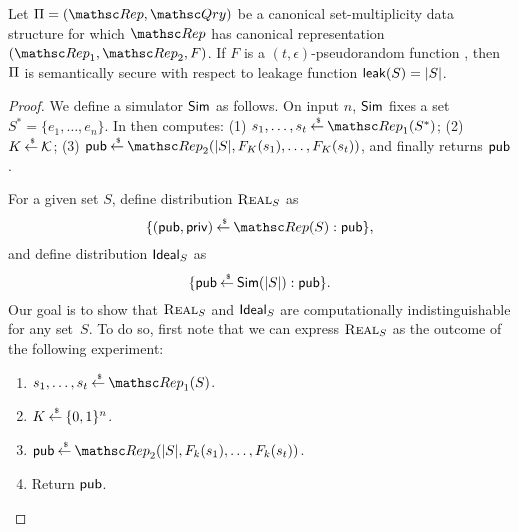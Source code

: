 \begin{theorem}
Let $\setprim=(\Rep, \Qry)$ be a canonical set-multiplicity data structure for which $\Rep$ has canonical representation
$(\Rep_1, \Rep_2, F)$. If $F$ is a $(t, \epsilon)$-pseudorandom
function , then $\Pi$ is semantically secure
with respect to leakage function ${\sf leak}(S) = |S|$.
\end{theorem}
\begin{proof}
We define a simulator ${\sf Sim}$ as follows. On input $n$, ${\sf Sim}$ fixes a
set $S^*=\{e_1, \ldots, e_n\}$. In then computes:
(1) $s_1, \ldots, s_t \getsr \Rep_1(S^*)$;
(2) $K {\:\stackrel{{\scriptscriptstyle \hspace{0.2em}\$}} {\leftarrow}\:} {\cal K}$;
(3) $\pubaux \getsr \Rep_2(|S|, F_K(s_1), \ldots, F_K(s_t))$, and
finally returns ${\sf pub}$.

\def\hyb{\mbox{{\sc Hyb}}}

For a given set $S$, define distribution $\mbox{{\sc Real}}_S$ as
\[ \{ (\pubaux, \privaux) \getsr \Rep(S) : \pubaux\},\]
and define distribution $\mbox{{\sf Ideal}}_S$ as
\[ \{ {\sf pub} {\:\stackrel{{\scriptscriptstyle \hspace{0.2em}\$}} {\leftarrow}\:} {\sf Sim}(|S|) : {\sf pub} \}.\]
Our goal is to show that $\mbox{{\sc Real}}_S$ and $\mbox{{\sf Ideal}}_S$ are computationally
indistinguishable for any set~$S$. 
To do so, first note that we can express $\mbox{{\sc Real}}_S$ as the outcome of
the following experiment: 
\begin{enumerate}
\item $s_1, \ldots, s_t \getsr \Rep_1(S)$.
\item $K {\:\stackrel{{\scriptscriptstyle \hspace{0.2em}\$}} {\leftarrow}\:} \{0,1\}^n$.
\item $\pubaux \getsr \Rep_2(|S|, F_k(s_1), \ldots, F_k(s_t))$.
\item Return ${\sf pub}$.
\end{enumerate}


\end{proof}
